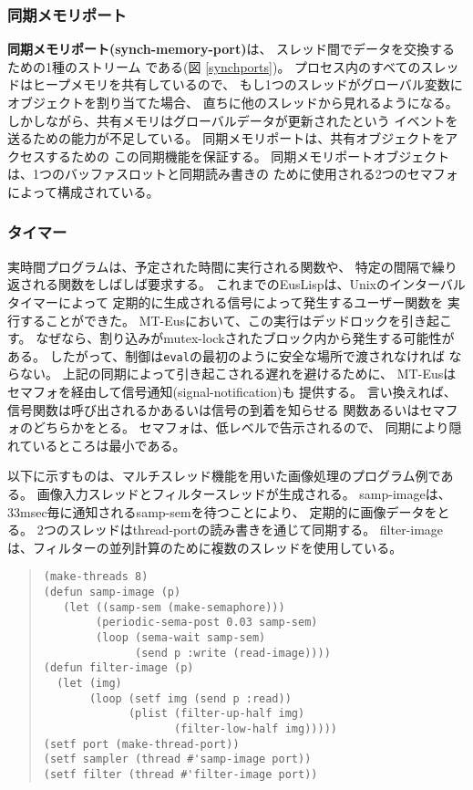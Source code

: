 \subsubsection{同期メモリポート}
{\bf 同期メモリポート(synch-memory-port)}は、
スレッド間でデータを交換するための1種のストリーム
である(図 \ref{synchports})。
プロセス内のすべてのスレッドはヒープメモリを共有しているので、
もし1つのスレッドがグローバル変数にオブジェクトを割り当てた場合、
直ちに他のスレッドから見れるようになる。
しかしながら、共有メモリはグローバルデータが更新されたという
イベントを送るための能力が不足している。
同期メモリポートは、共有オブジェクトをアクセスするための
この同期機能を保証する。
同期メモリポートオブジェクトは、1つのバッファスロットと同期読み書きの
ために使用される2つのセマフォによって構成されている。

\subsubsection{タイマー}
実時間プログラムは、予定された時間に実行される関数や、
特定の間隔で繰り返される関数をしばしば要求する。
これまでのEusLispは、Unixのインターバルタイマーによって
定期的に生成される信号によって発生するユーザー関数を
実行することができた。
MT-Eusにおいて、この実行はデッドロックを引き起こす。
なぜなら、割り込みがmutex-lockされたブロック内から発生する可能性がある。
したがって、制御は{\tt eval}の最初のように安全な場所で渡されなければ
ならない。
上記の同期によって引き起こされる遅れを避けるために、
MT-Eusはセマフォを経由して信号通知(signal-notification)も
提供する。
言い換えれば、信号関数は呼び出されるかあるいは信号の到着を知らせる
関数あるいはセマフォのどちらかをとる。
セマフォは、低レベルで告示されるので、
同期により隠れているところは最小である。

以下に示すものは、マルチスレッド機能を用いた画像処理のプログラム例である。
画像入力スレッドとフィルタースレッドが生成される。
samp-imageは、33msec毎に通知されるsamp-semを待つことにより、
定期的に画像データをとる。
2つのスレッドはthread-portの読み書きを通じて同期する。
filter-imageは、フィルターの並列計算のために複数のスレッドを使用している。

\begin{quote}
\begin{verbatim}
(make-threads 8)
(defun samp-image (p)
   (let ((samp-sem (make-semaphore)))
        (periodic-sema-post 0.03 samp-sem)
        (loop (sema-wait samp-sem)
              (send p :write (read-image))))
(defun filter-image (p)
  (let (img)
       (loop (setf img (send p :read))
             (plist (filter-up-half img)
                    (filter-low-half img)))))
(setf port (make-thread-port))
(setf sampler (thread #'samp-image port))
(setf filter (thread #'filter-image port))
\end{verbatim}
\end{quote}

